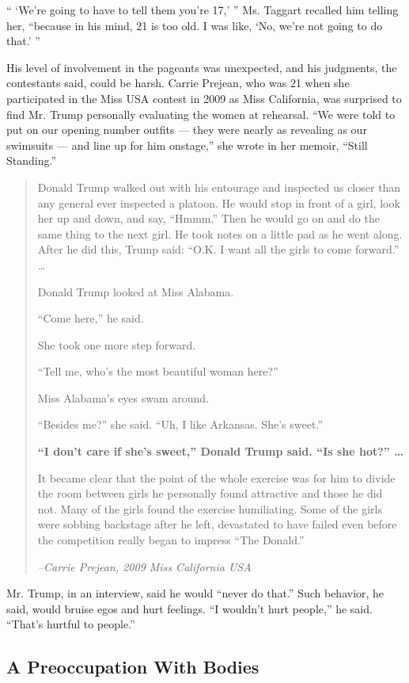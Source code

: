 `` `We're going to have to tell them you're 17,' '' Ms. Taggart recalled
him telling her, ``because in his mind, 21 is too old. I was like, `No,
we're not going to do that.' ''

His level of involvement in the pageants was unexpected, and his
judgments, the contestants said, could be harsh. Carrie Prejean, who was
21 when she participated in the Miss USA contest in 2009 as Miss
California, was surprised to find Mr. Trump personally evaluating the
women at rehearsal. ``We were told to put on our opening number outfits
--- they were nearly as revealing as our swimsuits --- and line up for
him onstage,'' she wrote in her memoir, ``Still Standing.''

\begin{quote}
Donald Trump walked out with his entourage and inspected us closer than
any general ever inspected a platoon. He would stop in front of a girl,
look her up and down, and say, ``Hmmm.'' Then he would go on and do the
same thing to the next girl. He took notes on a little pad as he went
along. After he did this, Trump said: ``O.K. I want all the girls to
come forward.'' \ldots{}

Donald Trump looked at Miss Alabama.

``Come here,'' he said.

She took one more step forward.

``Tell me, who's the most beautiful woman here?''

Miss Alabama's eyes swam around.

``Besides me?'' she said. ``Uh, I like Arkansas. She's sweet.''

\textbf{``I don't care if she's sweet,'' Donald Trump said. ``Is she
hot?'' \ldots{}}

It became clear that the point of the whole exercise was for him to
divide the room between girls he personally found attractive and those
he did not. Many of the girls found the exercise humiliating. Some of
the girls were sobbing backstage after he left, devastated to have
failed even before the competition really began to impress ``The
Donald.''

\emph{--Carrie Prejean, 2009 Miss California USA}
\end{quote}

Mr. Trump, in an interview, said he would ``never do that.'' Such
behavior, he said, would bruise egos and hurt feelings. ``I wouldn't
hurt people,'' he said. ``That's hurtful to people.''

\hypertarget{a-preoccupation-with-bodies}{%
\subsection{A Preoccupation With
Bodies}\label{a-preoccupation-with-bodies}}

